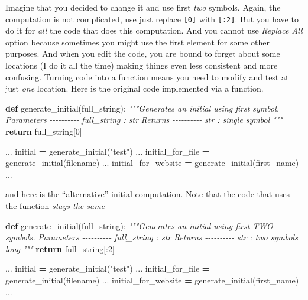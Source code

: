 \documentclass[
]{book}
\newenvironment{Shaded}{\begin{snugshade}}{\end{snugshade}}
\newcommand{\CommentTok}[1]{\textcolor[rgb]{0.56,0.35,0.01}{\textit{#1}}}
\newcommand{\ControlFlowTok}[1]{\textcolor[rgb]{0.13,0.29,0.53}{\textbf{#1}}}
\newcommand{\DecValTok}[1]{\textcolor[rgb]{0.00,0.00,0.81}{#1}}
\newcommand{\KeywordTok}[1]{\textcolor[rgb]{0.13,0.29,0.53}{\textbf{#1}}}
\newcommand{\NormalTok}[1]{#1}
\newcommand{\OperatorTok}[1]{\textcolor[rgb]{0.81,0.36,0.00}{\textbf{#1}}}
\newcommand{\StringTok}[1]{\textcolor[rgb]{0.31,0.60,0.02}{#1}}
\begin{document}
Imagine that you decided to change it and use first \emph{two} symbols. Again, the computation is not complicated, use just replace \texttt{{[}0{]}} with \texttt{{[}:2{]}}. But you have to do it for \emph{all} the code that does this computation. And you cannot use \emph{Replace All} option because sometimes you might use the first element for some other purposes. And when you edit the code, you are bound to forget about some locations (I do it all the time) making things even less consistent and more confusing. Turning code into a function means you need to modify and test at just \emph{one} location. Here is the original code implemented via a function.

\begin{Shaded}
\begin{Highlighting}[]
\KeywordTok{def}\NormalTok{ generate\_initial(full\_string):}
    \CommentTok{"""Generates an initial using first symbol.}
\CommentTok{    }
\CommentTok{    Parameters}
\CommentTok{    {-}{-}{-}{-}{-}{-}{-}{-}{-}{-}}
\CommentTok{    full\_string : str}
\CommentTok{    }
\CommentTok{    Returns}
\CommentTok{    {-}{-}{-}{-}{-}{-}{-}{-}{-}{-}}
\CommentTok{    str : single symbol}
\CommentTok{    """}
    \ControlFlowTok{return}\NormalTok{ full\_string[}\DecValTok{0}\NormalTok{]}

\NormalTok{...}
\NormalTok{initial }\OperatorTok{=}\NormalTok{ generate\_initial(}\StringTok{"test"}\NormalTok{)}
\NormalTok{...}
\NormalTok{initial\_for\_file }\OperatorTok{=}\NormalTok{ generate\_initial(filename)}
\NormalTok{...}
\NormalTok{initial\_for\_website }\OperatorTok{=}\NormalTok{ generate\_initial(first\_name)}
\NormalTok{...}
\end{Highlighting}
\end{Shaded}

and here is the ``alternative'' initial computation. Note that the code that uses the function \emph{stays the same}

\begin{Shaded}
\begin{Highlighting}[]
\KeywordTok{def}\NormalTok{ generate\_initial(full\_string):}
    \CommentTok{"""Generates an initial using first TWO symbols.}
\CommentTok{    }
\CommentTok{    Parameters}
\CommentTok{    {-}{-}{-}{-}{-}{-}{-}{-}{-}{-}}
\CommentTok{    full\_string : str}
\CommentTok{    }
\CommentTok{    Returns}
\CommentTok{    {-}{-}{-}{-}{-}{-}{-}{-}{-}{-}}
\CommentTok{    str : two symbols long}
\CommentTok{    """}
    \ControlFlowTok{return}\NormalTok{ full\_string[:}\DecValTok{2}\NormalTok{]}

\NormalTok{...}
\NormalTok{initial }\OperatorTok{=}\NormalTok{ generate\_initial(}\StringTok{"test"}\NormalTok{)}
\NormalTok{...}
\NormalTok{initial\_for\_file }\OperatorTok{=}\NormalTok{ generate\_initial(filename)}
\NormalTok{...}
\NormalTok{initial\_for\_website }\OperatorTok{=}\NormalTok{ generate\_initial(first\_name)}
\NormalTok{...}
\end{Highlighting}
\end{Shaded}
\end{document}
